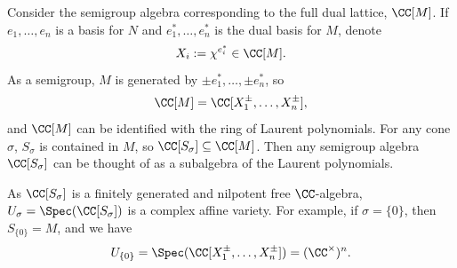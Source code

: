 \documentclass[12pt]{amsart}
\theoremstyle{plain}
\begin{document}
Consider the semigroup algebra corresponding to the full dual lattice, $\CC[M]$.
If $e_1, \ldots, e_n$ is a basis for $N$ and $e_1^*, \ldots, e_n^*$ is the dual basis for $M$, denote
$$X_i := \chi^{e_i^*} \in \CC[M].$$
As a semigroup, $M$ is generated by $\pm e_1^*, \ldots, \pm e_n^*$, so
$$\CC[M] = \CC[X_1^\pm, \ldots, X_n^\pm],$$
and $\CC[M]$ can be identified with the ring of Laurent polynomials.
For any cone $\sigma$, $S_\sigma$ is contained in $M$, so $\CC[S_\sigma]\subseteq\CC[M]$. 
Then any semigroup algebra $\CC[S_\sigma]$ can be thought of as a subalgebra of the Laurent polynomials.

As $\CC[S_\sigma]$ is a finitely generated and nilpotent free $\CC$-algebra, $U_\sigma = \Spec(\CC[S_\sigma])$ is a complex affine variety.
For example, if $\sigma = \{0\}$, then $S_{\{0\}}= M$, and we have
$$U_{\{0\}} = \Spec(\CC[X_1^\pm, \ldots, X_n^\pm]) = (\CC^\times)^n.$$
\end{document}
